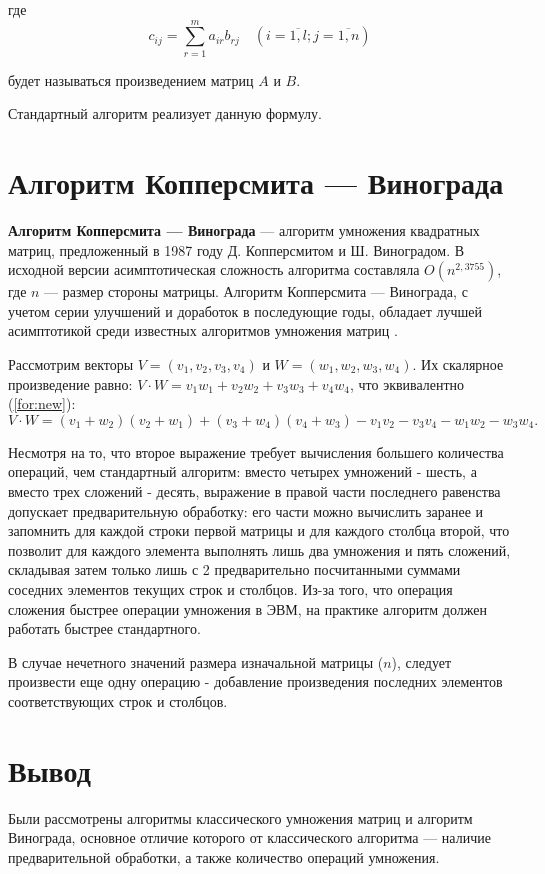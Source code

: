 где
\begin{equation}
	\label{eq:M}
	c_{ij} =
	\sum_{r=1}^{m} a_{ir}b_{rj} \quad (i=\overline{1,l}; j=\overline{1,n})
\end{equation}

будет называться произведением матриц $A$ и $B$.

Стандартный алгоритм реализует данную формулу.

\section{Алгоритм Копперсмита --- Винограда}

\textbf{Алгоритм Копперсмита --- Винограда} \cite{vinogr} — алгоритм умножения квадратных матриц, предложенный в 1987 году Д. Копперсмитом и Ш. Виноградом.
В исходной версии асимптотическая сложность алгоритма составляла $O(n^{2,3755})$, где  $n$ — размер стороны матрицы.
Алгоритм Копперсмита --- Винограда, с учетом серии улучшений и доработок в последующие годы, обладает лучшей асимптотикой среди известных алгоритмов умножения матриц \cite{Cohn}.


Рассмотрим векторы $V = (v_1, v_2, v_3, v_4)$ и $W = (w_1, w_2, w_3, w_4)$.
Их скалярное произведение равно: $V \cdot W = v_1w_1 + v_2w_2 + v_3w_3 + v_4w_4$, что эквивалентно (\ref{for:new}):
\begin{equation}
	\label{for:new}
	V \cdot W = (v_1 + w_2)(v_2 + w_1) + (v_3 + w_4)(v_4 + w_3) - v_1v_2 - v_3v_4 - w_1w_2 - w_3w_4.
\end{equation}

Несмотря на то, что второе выражение требует вычисления большего количества операций, чем стандартный алгоритм: вместо четырех умножений - шесть, а вместо трех сложений - десять, выражение в правой части последнего равенства допускает предварительную обработку: его части можно вычислить заранее и запомнить для каждой строки первой матрицы и для каждого столбца второй, что позволит для каждого элемента выполнять лишь два умножения и пять сложений, складывая затем только лишь с 2 предварительно посчитанными суммами соседних элементов текущих строк и столбцов.
Из-за того, что операция сложения быстрее операции умножения в ЭВМ, на практике алгоритм должен работать быстрее стандартного.

В случае нечетного значений размера изначальной матрицы ($n$), следует произвести еще одну операцию - добавление произведения последних элементов соответствующих строк и столбцов.

\section*{Вывод}
Были рассмотрены алгоритмы классического умножения матриц и алгоритм Винограда, основное отличие которого от классического алгоритма — наличие предварительной обработки, а также количество операций умножения.


